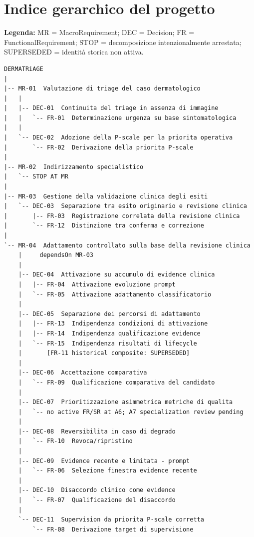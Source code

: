 \documentclass[11pt,a4paper]{article}
\begin{document}
\section*{Indice gerarchico del progetto}

\begin{hierarchybox}[title={DermaTriage - active A6 hierarchy}]
{\small\textbf{Legenda:} MR = MacroRequirement; DEC = Decision; FR = FunctionalRequirement; STOP = decomposizione intenzionalmente arrestata; SUPERSEDED = identità storica non attiva.}
\begin{lstlisting}[basicstyle=\ttfamily\scriptsize]
DERMATRiAGE
|
|-- MR-01  Valutazione di triage del caso dermatologico
|   |
|   |-- DEC-01  Continuita del triage in assenza di immagine
|   |   `-- FR-01  Determinazione urgenza su base sintomatologica
|   |
|   `-- DEC-02  Adozione della P-scale per la priorita operativa
|       `-- FR-02  Derivazione della priorita P-scale
|
|-- MR-02  Indirizzamento specialistico
|   `-- STOP AT MR
|
|-- MR-03  Gestione della validazione clinica degli esiti
|   `-- DEC-03  Separazione tra esito originario e revisione clinica
|       |-- FR-03  Registrazione correlata della revisione clinica
|       `-- FR-12  Distinzione tra conferma e correzione
|
`-- MR-04  Adattamento controllato sulla base della revisione clinica
    |     dependsOn MR-03
    |
    |-- DEC-04  Attivazione su accumulo di evidence clinica
    |   |-- FR-04  Attivazione evoluzione prompt
    |   `-- FR-05  Attivazione adattamento classificatorio
    |
    |-- DEC-05  Separazione dei percorsi di adattamento
    |   |-- FR-13  Indipendenza condizioni di attivazione
    |   |-- FR-14  Indipendenza qualificazione evidence
    |   `-- FR-15  Indipendenza risultati di lifecycle
    |       [FR-11 historical composite: SUPERSEDED]
    |
    |-- DEC-06  Accettazione comparativa
    |   `-- FR-09  Qualificazione comparativa del candidato
    |
    |-- DEC-07  Prioritizzazione asimmetrica metriche di qualita
    |   `-- no active FR/SR at A6; A7 specialization review pending
    |
    |-- DEC-08  Reversibilita in caso di degrado
    |   `-- FR-10  Revoca/ripristino
    |
    |-- DEC-09  Evidence recente e limitata - prompt
    |   `-- FR-06  Selezione finestra evidence recente
    |
    |-- DEC-10  Disaccordo clinico come evidence
    |   `-- FR-07  Qualificazione del disaccordo
    |
    `-- DEC-11  Supervision da priorita P-scale corretta
        `-- FR-08  Derivazione target di supervisione
\end{lstlisting}
\end{hierarchybox}
\end{document}
